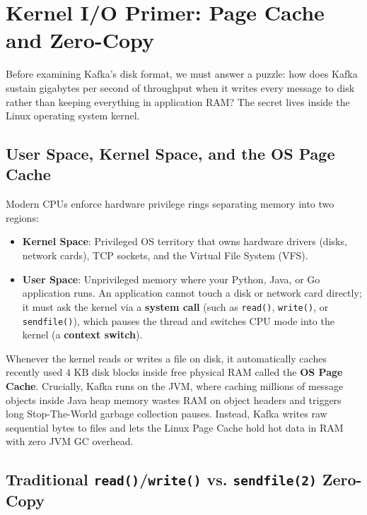 \section{Kernel I/O Primer: Page Cache and Zero-Copy}

Before examining Kafka's disk format, we must answer a puzzle: how does Kafka sustain gigabytes per second of throughput when it writes every message to disk rather than keeping everything in application RAM? The secret lives inside the Linux operating system kernel.

\subsection{User Space, Kernel Space, and the OS Page Cache}

Modern CPUs enforce hardware privilege rings separating memory into two regions:
\begin{itemize}[leftmargin=18pt]
  \item \textbf{Kernel Space}: Privileged OS territory that owns hardware drivers (disks, network cards), TCP sockets, and the Virtual File System (VFS).
  \item \textbf{User Space}: Unprivileged memory where your Python, Java, or Go application runs. An application cannot touch a disk or network card directly; it must ask the kernel via a \textbf{system call} (such as \texttt{read()}, \texttt{write()}, or \texttt{sendfile()}), which pauses the thread and switches CPU mode into the kernel (a \textbf{context switch}).
\end{itemize}

Whenever the kernel reads or writes a file on disk, it automatically caches recently used $4\text{ KB}$ disk blocks inside free physical RAM called the \textbf{OS Page Cache}. Crucially, Kafka runs on the JVM, where caching millions of message objects inside Java heap memory wastes RAM on object headers and triggers long Stop-The-World garbage collection pauses. Instead, Kafka writes raw sequential bytes to files and lets the Linux Page Cache hold hot data in RAM with zero JVM GC overhead.

\subsection{Traditional \texttt{read()}/\texttt{write()} vs. \texttt{sendfile(2)} Zero-Copy}

